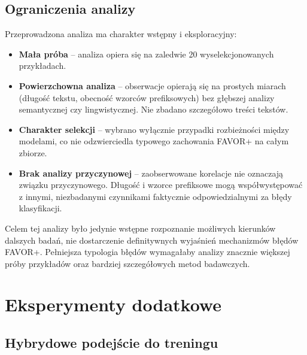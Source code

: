 \documentclass[a4paper,11pt,twoside]{report}
\theoremstyle{definition}
\begin{document}
\subsection{Ograniczenia analizy}

Przeprowadzona analiza ma charakter wstępny i eksploracyjny:

\begin{itemize}
    \item \textbf{Mała próba} -- analiza opiera się na zaledwie 20 wyselekcjonowanych przykładach.
    
    \item \textbf{Powierzchowna analiza} -- obserwacje opierają się na prostych miarach (długość tekstu, obecność wzorców prefiksowych) bez głębszej analizy semantycznej czy lingwistycznej. Nie zbadano szczegółowo treści tekstów.
    
    \item \textbf{Charakter selekcji} -- wybrano wyłącznie przypadki rozbieżności między modelami, co nie odzwierciedla typowego zachowania FAVOR+ na całym zbiorze.
    
    \item \textbf{Brak analizy przyczynowej} -- zaobserwowane korelacje nie oznaczają związku przyczynowego. Długość i wzorce prefiksowe mogą współwystępować z innymi, niezbadanymi czynnikami faktycznie odpowiedzialnymi za błędy klasyfikacji.
\end{itemize}

Celem tej analizy było jedynie wstępne rozpoznanie możliwych kierunków dalszych badań, nie dostarczenie definitywnych wyjaśnień mechanizmów błędów FAVOR+. Pełniejsza typologia błędów wymagałaby analizy znacznie większej próby przykładów oraz bardziej szczegółowych metod badawczych.






















\section{Eksperymenty dodatkowe}

\subsection{Hybrydowe podejście do treningu}\label{sec:hybrid-experiment}
\end{document}

